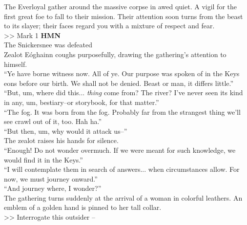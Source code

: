 The Everloyal gather around the massive corpse in awed quiet. A vigil for the first great foe to fall to their mission. Their attention soon turns from the beast to its slayer; their faces regard you with a mixture of respect and fear.\\
>> Mark 1 \textbf{HMN}\\
 The Snickersnee was defeated\\

Zealot Eóghainn coughs purposefully, drawing the gathering’s attention to himself.\\

“Ye have borne witness now. All of ye. Our purpose was spoken of in the Keys eons before our birth. We shall not be denied. Beast or man, it differs little.”\\

“But, um, where did this... \emph{thing} come from? The river? I’ve never seen its kind in any, um, bestiary--or storybook, for that matter.”\\

“The fog. It was born from the fog. Probably far from the strangest thing we’ll see crawl out of it, too. Hah ha.”\\

“But then, um, why would it attack us--”\\

The zealot raises his hands for silence.\\
“Enough! Do not wonder overmuch. If we were meant for such knowledge, we would find it in the Keys.”\\

“I will contemplate them in search of answers... when circumstances allow. For now, we must journey onward.”\\

“And journey where, I wonder?”\\

The gathering turns suddenly at the arrival of a woman in colorful leathers. An emblem of a golden hand is pinned to her tall collar.\\

>> Interrogate this outsider -- 